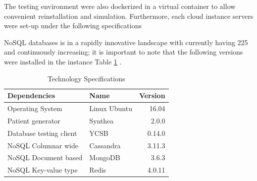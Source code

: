 \documentclass[5p]{elsarticle}
\begin{document}
The testing environment were also dockerized in a virtual container to allow convenient reinstallation and simulation. 
Furthermore, each cloud instance servers were set-up under the following specifications

NoSQL databases is in a rapidly innovative landscape with currently having 225 \cite{S.Edlich2018} and continuously increasing; 
it is important to note that the following versions were installed in the instance Table \ref{table.technology.versions} .
\begin{table}[hb]
    \centering															
    \caption{Technology Specifications}
     \label{table.technology.versions}
     \begin{tabular}{llr}
        \toprule
        Dependencies & Name & Version\\
        \hline
        Operating System        & Linux Ubuntu & 16.04\\
        Patient generator       & Synthea      & 2.0.0\\
        Database testing client & YCSB         & 0.14.0\\
        NoSQL Columnar wide     & Cassandra    & 3.11.3\\
        NoSQL Document based    & MongoDB      & 3.6.3\\
        NoSQL Key-value type    & Redis        & 4.0.11\\
        \hline
    \end{tabular}															
\end{table}
\end{document}
